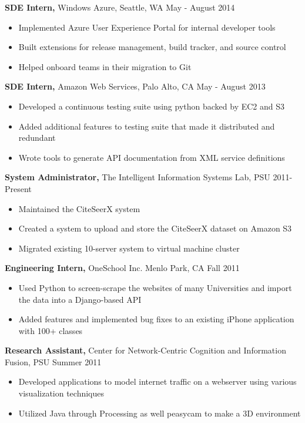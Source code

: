 \documentclass[margin]{res}
\begin{document}
\begin{resume}
{\bf SDE Intern,} Windows Azure, Seattle, WA \hfill May - August 2014
\begin{itemize} \itemsep -2pt  %
\item Implemented Azure User Experience Portal for internal developer tools
\item Built extensions for release management, build tracker, and source control
\item Helped onboard teams in their migration to Git
\end{itemize}

{\bf SDE Intern,} Amazon Web Services, Palo Alto, CA \hfill May - August 2013
\begin{itemize} \itemsep -2pt  %
\item Developed a continuous testing suite using python backed by EC2 and S3
\item Added additional features to testing suite that made it distributed and redundant 
\item Wrote tools to generate API documentation from XML service definitions
\end{itemize}

{\bf System Administrator,} The Intelligent Information Systems Lab, PSU \hfill 2011-Present
\begin{itemize} \itemsep -2pt  %
\item Maintained the CiteSeerX system 
\item Created a system to upload and store the CiteSeerX dataset on Amazon S3
\item Migrated existing 10-server system to virtual machine cluster 
\end{itemize}
 
{\bf Engineering Intern,} OneSchool Inc. Menlo Park, CA \hfill Fall 2011
\begin{itemize} \itemsep -2pt %
\item Used Python to screen-scrape the websites of many Universities and import the data into a Django-based API
\item Added features and implemented bug fixes to an existing iPhone application with 100+ classes
\end{itemize}

{\bf Research Assistant,} Center for Network-Centric Cognition and Information Fusion, PSU \hfill Summer 2011
\begin{itemize} \itemsep -2pt
\item Developed applications to model internet traffic on a webserver using various visualization techniques 
\item Utilized Java through Processing as well peasycam to make a 3D environment
\end{itemize}


\end{resume}
\end{document}
